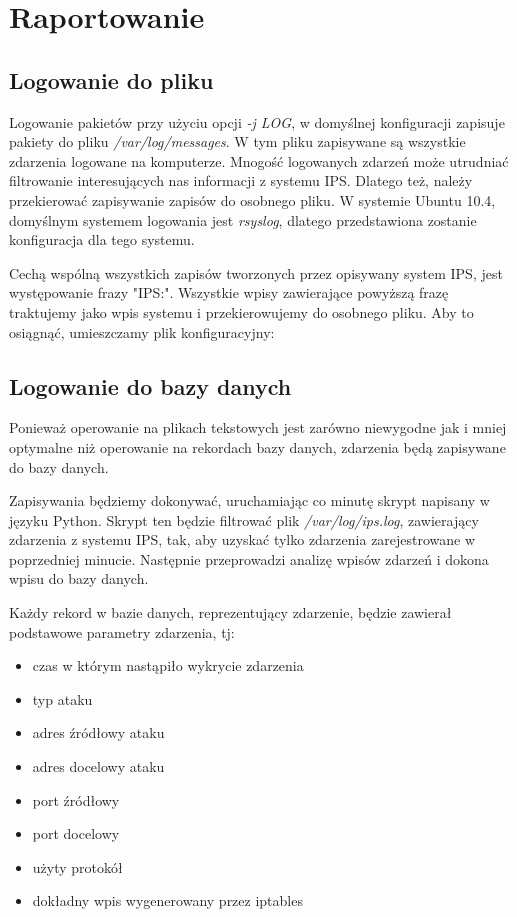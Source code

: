 \chapter{Raportowanie}
	\section{Logowanie do pliku}
		Logowanie pakietów przy użyciu opcji \textit{-j LOG}, w domyślnej konfiguracji zapisuje pakiety do pliku \textit{/var/log/messages}.
		W tym pliku zapisywane są wszystkie zdarzenia logowane na komputerze.
		Mnogość logowanych zdarzeń może utrudniać filtrowanie interesujących nas informacji z systemu IPS.
		Dlatego też, należy przekierować zapisywanie zapisów do osobnego pliku.
		W systemie Ubuntu 10.4, domyślnym systemem logowania jest \textit{rsyslog}, dlatego przedstawiona zostanie konfiguracja dla tego systemu.
		
		Cechą wspólną wszystkich zapisów tworzonych przez opisywany system IPS, jest występowanie frazy "IPS:".
		Wszystkie wpisy zawierające powyższą frazę traktujemy jako wpis systemu i przekierowujemy do osobnego pliku.
		Aby to osiągnąć, umieszczamy plik konfiguracyjny:
		
	\section{Logowanie do bazy danych}
		Ponieważ operowanie na plikach tekstowych jest zarówno niewygodne jak i mniej optymalne niż operowanie na rekordach bazy danych, zdarzenia będą zapisywane do bazy danych.

		Zapisywania będziemy dokonywać, uruchamiając co minutę skrypt napisany w języku Python.
		Skrypt ten będzie filtrować plik \textit{/var/log/ips.log}, zawierający zdarzenia z systemu IPS, tak, aby uzyskać tylko zdarzenia zarejestrowane w poprzedniej minucie.
		Następnie przeprowadzi analizę wpisów zdarzeń i dokona wpisu do bazy danych.

		Każdy rekord w bazie danych, reprezentujący zdarzenie, będzie zawierał podstawowe parametry zdarzenia, tj:
		\begin{itemize}
			\item czas w którym nastąpiło wykrycie zdarzenia
			\item typ ataku
			\item adres źródłowy ataku
			\item adres docelowy ataku
			\item port źródłowy
			\item port docelowy
			\item użyty protokół
			\item dokładny wpis wygenerowany przez iptables
		\end{itemize}

